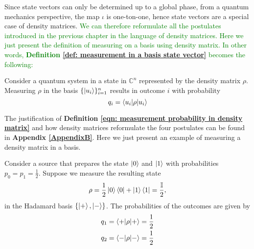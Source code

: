 Since state vectors can only be determined up to a global phase, from a quantum mechanics perspective, the map $\iota$ is one-ton-one, hence state vectors are a special case of density matrices. \textcolor{green}{We can therefore reformulate all the postulates introduced in the previous chapter in the language of density matrices. Here we just present the definition of measuring on a basis using density matrix. In other words, \textbf{Definition \ref{def: measurement in a basis state vector}} becomes the following:}


\begin{definition}
Consider a quantum system in a state in $\mathbb{C}^n$ represented by the density matrix $\rho$. Measuring $\rho$ in the basis $\{\ket{u_i}\}_{i=1}^n$ results in outcome $i$ with probability 
\begin{equation} \label{eqn: measurement probability in density matrix}
    q_i=\braket{u_i | \rho |u_i}
\end{equation}
\end{definition}

{\color{green}
The justification of \textbf{Definition \ref{eqn: measurement probability in density matrix}} and how density matrices reformulate the four postulates can be found in \textbf{Appendix \ref{AppendixB}}. Here we just present an example of measuring a density matrix in a basis.


\begin{example}
Consider a source that prepares the state $\ket{0}$ and $\ket{1}$ with probabilities $p_0=p_1=\frac{1}{2}$. Suppose we measure the resulting state
$$\rho=\frac{1}{2}\ket{0}\bra{0}+\ket{1}\bra{1}=\frac{\mathbb{I}}{2},$$
in the Hadamard basis $\{\ket{+}, \ket{-}\}$. The probabilities of the outcomes are given by 
\begin{gather}
    q_1=\braket{+|\rho|+}=\frac{1}{2}\\
    q_2=\braket{-|\rho|-}=\frac{1}{2}
\end{gather}
\end{example}
}

